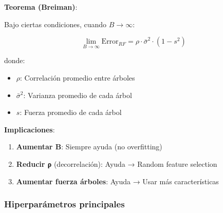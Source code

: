 \documentclass[
  doc,
  floatsintext,
  longtable,
  a4paper,
  nolmodern,
  notxfonts,
  notimes,
  12pt,
  colorlinks=true,linkcolor=blue,citecolor=blue,urlcolor=blue]{apa7}
\providecommand{\tightlist}{%
  \setlength{\itemsep}{0pt}\setlength{\parskip}{0pt}}
\begin{document}
\textbf{Teorema (Breiman)}:

Bajo ciertas condiciones, cuando \(B \to \infty\):

\[
\lim_{B \to \infty} \text{Error}_{RF} = \rho \cdot \bar{\sigma}^2 \cdot (1 - s^2)
\]

donde:

\begin{itemize}
\tightlist
\item
  \(\rho\): Correlación promedio entre árboles
\item
  \(\bar{\sigma}^2\): Varianza promedio de cada árbol
\item
  \(s\): Fuerza promedio de cada árbol
\end{itemize}

\textbf{Implicaciones}:

\begin{enumerate}
\def\labelenumi{\arabic{enumi}.}
\tightlist
\item
  \textbf{Aumentar B}: Siempre ayuda (no overfitting)
\item
  \textbf{Reducir ρ} (decorrelación): Ayuda → Random feature selection
\item
  \textbf{Aumentar fuerza árboles}: Ayuda → Usar más características
\end{enumerate}

\subsubsection{Hiperparámetros
principales}\label{hiperparuxe1metros-principales-1}
\end{document}
